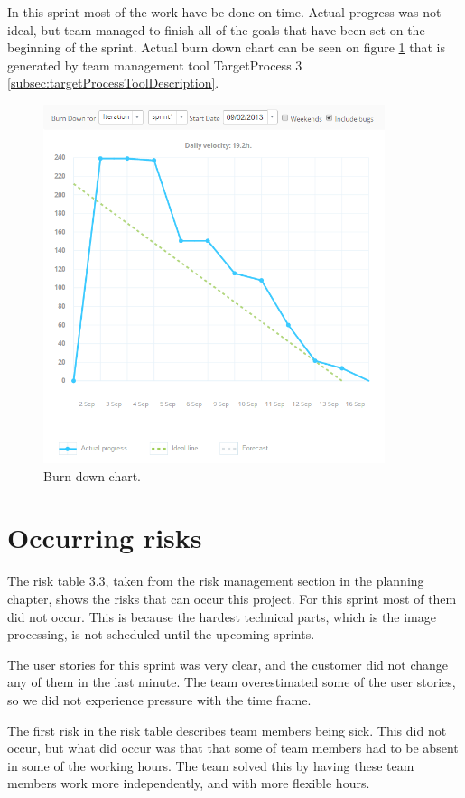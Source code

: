 In this sprint most of the work have be done on time. Actual progress was not ideal, but team managed to finish all of the goals that have been set on the beginning of the sprint.
Actual burn down chart can be seen on figure \ref{fig:Burn1 } that is generated by team  management tool TargetProcess 3 \ref{subsec:targetProcessToolDescription}.  

\begin{figure}[H]
	\centering
		\includegraphics[width=10cm]{sprint1/sprint1_burndown.png}
	\caption{Burn down chart.}
	\label{fig:Burn1 }
\end{figure}


\section{Occurring risks}
The risk table 3.3, taken from the risk management section in the planning chapter, shows the risks that can occur this project. 
For this sprint most of them did not occur. 
This is because the hardest technical parts, which is the image processing, is not scheduled until the upcoming sprints. 

The user stories for this sprint was very clear, and the customer did not change any of them in the last minute. The team overestimated some of the user stories, so we did not experience pressure with the time frame. 

The first risk in the risk table describes team members being sick. This did not occur, but what did occur was that that some of team members had to be absent in some of the working hours. 
The team solved this by having these team members work more independently, and with more flexible hours.  

